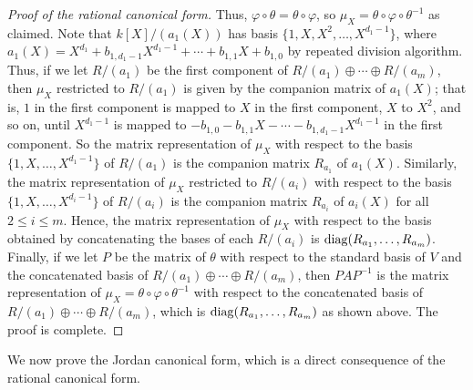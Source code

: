 \begin{proof}[Proof of the rational canonical form]
    Thus, $\varphi \circ \theta = \theta \circ \varphi$, so $\mu_{X} = \theta \circ \varphi \circ \theta^{-1}$ as claimed. Note that $k[X]/(a_{1}(X))$ has basis $\{1,X,X^{2},\ldots,X^{d_{1}-1}\}$, where $a_{1}(X) = X^{d_{1}} + b_{1,d_{1}-1}X^{d_{1}-1} + \cdots + b_{1,1}X + b_{1,0}$ by repeated division algorithm. Thus, if we let $R/(a_{1})$ be the first component of $R/(a_{1}) \oplus \cdots \oplus R/(a_{m})$, then $\mu_{X}$ restricted to $R/(a_{1})$ is given by the companion matrix of $a_{1}(X)$; that is, $1$ in the first component is mapped to $X$ in the first component, $X$ to $X^{2}$, and so on, until $X^{d_{1}-1}$ is mapped to $-b_{1,0} - b_{1,1}X - \cdots - b_{1,d_{1}-1}X^{d_{1}-1}$ in the first component. So the matrix representation of $\mu_{X}$ with respect to the basis $\{1,X,\ldots,X^{d_{1}-1}\}$ of $R/(a_{1})$ is the companion matrix $R_{a_{1}}$ of $a_{1}(X)$. Similarly, the matrix representation of $\mu_{X}$ restricted to $R/(a_{i})$ with respect to the basis $\{1,X,\ldots,X^{d_{i}-1}\}$ of $R/(a_{i})$ is the companion matrix $R_{a_{i}}$ of $a_{i}(X)$ for all $2 \leq i \leq m$. Hence, the matrix representation of $\mu_{X}$ with respect to the basis obtained by concatenating the bases of each $R/(a_{i})$ is $\operatorname{diag} (R_{a_{1}},\ldots,R_{a_{m}})$. Finally, if we let $P$ be the matrix of $\theta$ with respect to the standard basis of $V$ and the concatenated basis of $R/(a_{1}) \oplus \cdots \oplus R/(a_{m})$, then $PAP^{-1}$ is the matrix representation of $\mu_{X} = \theta \circ \varphi \circ \theta^{-1}$ with respect to the concatenated basis of $R/(a_{1}) \oplus \cdots \oplus R/(a_{m})$, which is $\operatorname{diag} (R_{a_{1}},\ldots,R_{a_{m}})$ as shown above. The proof is complete.
\end{proof}

We now prove the Jordan canonical form, which is a direct consequence of the rational canonical form.

